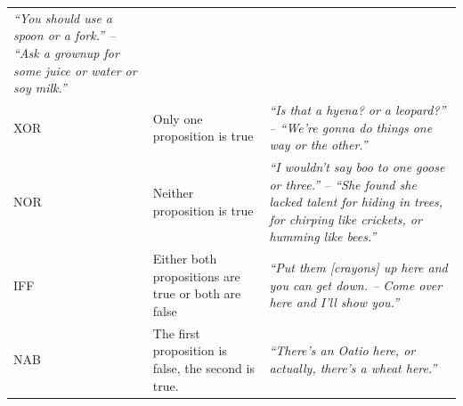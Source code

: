 \documentclass[,man,floatsintext]{apa6}
\begin{document}
\begin{longtable}[]{@{}lll@{}}
\begin{minipage}[t]{0.49\columnwidth}
\emph{\enquote{You should use a spoon or a fork.} -- \enquote{Ask a grownup for some juice or water or soy milk.}}\strut
\end{minipage}\tabularnewline
\begin{minipage}[t]{0.06\columnwidth}\raggedright
XOR\strut
\end{minipage} & \begin{minipage}[t]{0.36\columnwidth}\raggedright
Only one proposition is true\strut
\end{minipage} & \begin{minipage}[t]{0.49\columnwidth}\raggedright
\emph{\enquote{Is that a hyena? or a leopard?} -- \enquote{We're gonna do things one way or the other.}}\strut
\end{minipage}\tabularnewline
\begin{minipage}[t]{0.06\columnwidth}\raggedright
NOR\strut
\end{minipage} & \begin{minipage}[t]{0.36\columnwidth}\raggedright
Neither proposition is true\strut
\end{minipage} & \begin{minipage}[t]{0.49\columnwidth}\raggedright
\emph{\enquote{I wouldn't say boo to one goose or three.} -- \enquote{She found she lacked talent for hiding in trees, for chirping like crickets, or humming like bees.}}\strut
\end{minipage}\tabularnewline
\begin{minipage}[t]{0.06\columnwidth}\raggedright
IFF\strut
\end{minipage} & \begin{minipage}[t]{0.36\columnwidth}\raggedright
Either both propositions are true or both are false\strut
\end{minipage} & \begin{minipage}[t]{0.49\columnwidth}\raggedright
\emph{\enquote{Put them {[}crayons{]} up here and you can get down. -- Come over here and I'll show you.}}\strut
\end{minipage}\tabularnewline
\begin{minipage}[t]{0.06\columnwidth}\raggedright
NAB\strut
\end{minipage} & \begin{minipage}[t]{0.36\columnwidth}\raggedright
The first proposition is false, the second is true.\strut
\end{minipage} & \begin{minipage}[t]{0.49\columnwidth}\raggedright
\emph{\enquote{There's an Oatio here, or actually, there's a wheat here.}}\strut
\end{minipage}\tabularnewline
\bottomrule
\end{longtable}
\end{document}
